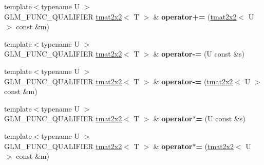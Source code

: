\begin{DoxyCompactItemize}
\item 
\hypertarget{structglm_1_1detail_1_1tmat2x2_ad8f2e4617586dd78afebde4c3ff8def8}{{\footnotesize template$<$typename U $>$ }\\G\-L\-M\-\_\-\-F\-U\-N\-C\-\_\-\-Q\-U\-A\-L\-I\-F\-I\-E\-R \hyperlink{structglm_1_1detail_1_1tmat2x2}{tmat2x2}$<$ T $>$ \& {\bfseries operator+=} (\hyperlink{structglm_1_1detail_1_1tmat2x2}{tmat2x2}$<$ U $>$ const \&m)}\label{structglm_1_1detail_1_1tmat2x2_ad8f2e4617586dd78afebde4c3ff8def8}

\item 
\hypertarget{structglm_1_1detail_1_1tmat2x2_ab20e83c652d9c2b82bb543129b1e4347}{{\footnotesize template$<$typename U $>$ }\\G\-L\-M\-\_\-\-F\-U\-N\-C\-\_\-\-Q\-U\-A\-L\-I\-F\-I\-E\-R \hyperlink{structglm_1_1detail_1_1tmat2x2}{tmat2x2}$<$ T $>$ \& {\bfseries operator-\/=} (U const \&s)}\label{structglm_1_1detail_1_1tmat2x2_ab20e83c652d9c2b82bb543129b1e4347}

\item 
\hypertarget{structglm_1_1detail_1_1tmat2x2_aca7986f1e088343368506dba60a8533b}{{\footnotesize template$<$typename U $>$ }\\G\-L\-M\-\_\-\-F\-U\-N\-C\-\_\-\-Q\-U\-A\-L\-I\-F\-I\-E\-R \hyperlink{structglm_1_1detail_1_1tmat2x2}{tmat2x2}$<$ T $>$ \& {\bfseries operator-\/=} (\hyperlink{structglm_1_1detail_1_1tmat2x2}{tmat2x2}$<$ U $>$ const \&m)}\label{structglm_1_1detail_1_1tmat2x2_aca7986f1e088343368506dba60a8533b}

\item 
\hypertarget{structglm_1_1detail_1_1tmat2x2_afaaac2e6f990ac871b0e4aa01c08ed34}{{\footnotesize template$<$typename U $>$ }\\G\-L\-M\-\_\-\-F\-U\-N\-C\-\_\-\-Q\-U\-A\-L\-I\-F\-I\-E\-R \hyperlink{structglm_1_1detail_1_1tmat2x2}{tmat2x2}$<$ T $>$ \& {\bfseries operator$\ast$=} (U const \&s)}\label{structglm_1_1detail_1_1tmat2x2_afaaac2e6f990ac871b0e4aa01c08ed34}

\item 
\hypertarget{structglm_1_1detail_1_1tmat2x2_a2d9a4891fbdc71f886ecbb3374a6c13d}{{\footnotesize template$<$typename U $>$ }\\G\-L\-M\-\_\-\-F\-U\-N\-C\-\_\-\-Q\-U\-A\-L\-I\-F\-I\-E\-R \hyperlink{structglm_1_1detail_1_1tmat2x2}{tmat2x2}$<$ T $>$ \& {\bfseries operator$\ast$=} (\hyperlink{structglm_1_1detail_1_1tmat2x2}{tmat2x2}$<$ U $>$ const \&m)}\label{structglm_1_1detail_1_1tmat2x2_a2d9a4891fbdc71f886ecbb3374a6c13d}


\end{DoxyCompactItemize}
